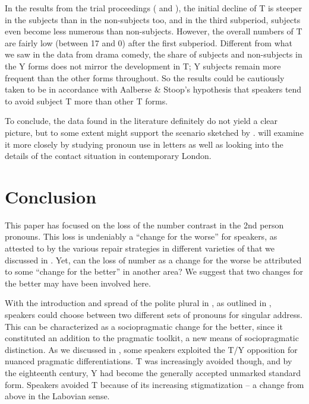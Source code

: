 \documentclass[output=paper,hidelinks]{langscibook}
\begin{document}
In the results from the trial proceedings ( and ), the initial decline of T is steeper in the subjects than in the non-subjects too, and in the third subperiod, subjects even become less numerous than non-subjects. However, the overall numbers of T are fairly low (between 17 and 0) after the first subperiod. Different from what we saw in the data from drama comedy, the share of subjects and non-subjects in the Y forms does not mirror the development in T; Y subjects remain more frequent than the other forms throughout. So the results could be cautiously taken to be in accordance with Aalberse \& Stoop’s hypothesis that speakers tend to avoid subject T more than other T forms. 

To conclude, the data found in the literature definitely do not yield a clear picture, but to some extent might support the scenario sketched by \citet{Aalberse2015}. \citet{Huberinprep} will examine it more closely by studying pronoun use in  letters as well as looking into the details of the contact situation in contemporary London.

\section{Conclusion}\label{sec:eh:6}

This paper has focused on the loss of the number contrast in the  2nd person pronouns. This loss is undeniably a \enquote{change for the worse} for speakers, as attested to by the various repair strategies in different varieties of  that we discussed in . Yet, can the loss of number as a change for the worse be attributed to some \enquote{change for the better} in another area? We suggest that two changes for the better may have been involved here.

With the introduction and spread of the polite plural in , as outlined in , speakers could choose between two different sets of pronouns for singular address. This can be characterized as a sociopragmatic change for the better, since it constituted an addition to the pragmatic toolkit, a new means of sociopragmatic distinction. As we discussed in , some speakers exploited the T/Y opposition for nuanced pragmatic differentiations. T was increasingly avoided though, and by the eighteenth century, Y had become the generally accepted unmarked standard form. Speakers avoided T because of its increasing stigmatization – a change from above in the Labovian sense. 
\end{document}
